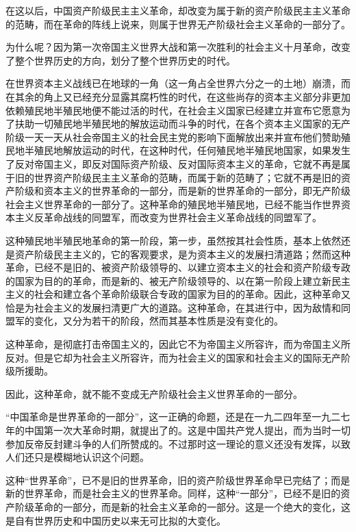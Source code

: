 \documentclass[UTF8, 12pt, a4paper]{ctexrep}
\begin{document}
在这以后，中国资产阶级民主主义革命，却改变为属于新的资产阶级民主主义革命的范畴，而在革命的阵线上说来，则属于世界无产阶级社会主义革命的一部分了。

为什么呢？因为第一次帝国主义世界大战和第一次胜利的社会主义十月革命，改变了整个世界历史的方向，划分了整个世界历史的时代。

在世界资本主义战线已在地球的一角（这一角占全世界六分之一的土地）崩溃，而在其余的角上又已经充分显露其腐朽性的时代，在这些尚存的资本主义部分非更加依赖殖民地半殖民地便不能过活的时代，在社会主义国家已经建立并宣布它愿意为了扶助一切殖民地半殖民地的解放运动而斗争的时代，在各个资本主义国家的无产阶级一天一天从社会帝国主义的社会民主党的影响下面解放出来并宣布他们赞助殖民地半殖民地解放运动的时代，在这种时代，任何殖民地半殖民地国家，如果发生了反对帝国主义，即反对国际资产阶级、反对国际资本主义的革命，它就不再是属于旧的世界资产阶级民主主义革命的范畴，而属于新的范畴了；它就不再是旧的资产阶级和资本主义的世界革命的一部分，而是新的世界革命的一部分，即无产阶级社会主义世界革命的一部分了。这种革命的殖民地半殖民地，已经不能当作世界资本主义反革命战线的同盟军，而改变为世界社会主义革命战线的同盟军了。

这种殖民地半殖民地革命的第一阶段，第一步，虽然按其社会性质，基本上依然还是资产阶级民主主义的，它的客观要求，是为资本主义的发展扫清道路；然而这种革命，已经不是旧的、被资产阶级领导的、以建立资本主义的社会和资产阶级专政的国家为目的的革命，而是新的、被无产阶级领导的、以在第一阶段上建立新民主主义的社会和建立各个革命阶级联合专政的国家为目的的革命。因此，这种革命又恰是为社会主义的发展扫清更广大的道路。这种革命，在其进行中，因为敌情和同盟军的变化，又分为若干的阶段，然而其基本性质是没有变化的。

这种革命，是彻底打击帝国主义的，因此它不为帝国主义所容许，而为帝国主义所反对。但是它却为社会主义所容许，而为社会主义的国家和社会主义的国际无产阶级所援助。

因此，这种革命，就不能不变成无产阶级社会主义世界革命的一部分。

“中国革命是世界革命的一部分”，这一正确的命题，还是在一九二四年至一九二七年的中国第一次大革命时期，就提出了的。这是中国共产党人提出，而为当时一切参加反帝反封建斗争的人们所赞成的。不过那时这一理论的意义还没有发挥，以致人们还只是模糊地认识这个问题。

这种“世界革命”，已不是旧的世界革命，旧的资产阶级世界革命早已完结了；而是新的世界革命，而是社会主义的世界革命。同样，这种“一部分”，已经不是旧的资产阶级革命的一部分，而是新的社会主义革命的一部分。这是一个绝大的变化，这是自有世界历史和中国历史以来无可比拟的大变化。
\end{document}
